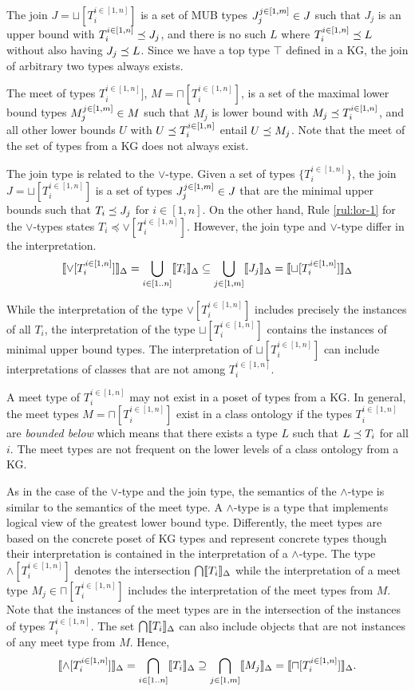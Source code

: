 \documentclass[runningheads]{llncs}
\newcommand{\llb}{\llbracket}
\newcommand{\rrb}{\rrbracket}
\begin{document}
The join $J=\sqcup[T_i^{i\in[1,n]}]$ is a set of MUB types
$J_j^{j\in[1,m]}\in\/J$ such that $J_j$ is an upper bound with
$T_i^{i\in[1,n]}\preceq\/J_j$, and there is no such $L$ where
$T_i^{i\in[1,n]}\preceq\/L$ without also having $J_j\preceq\/L$. Since
we have a top type $\top$ defined in a KG, the join of arbitrary two
types always exists.

The meet of types $T_i^{i\in[1,n]}]$, $M=\sqcap[T_i^{i\in[1,n]}]$, is
a set of the maximal lower bound types $M_j^{j\in[1,m]}\in\/M$ such
that $M_j$ is lower bound with $M_j\preceq\/T_i^{i\in[1,n]}$, and all
other lower bounds $U$ with $U\preceq\/T_i^{i\in[1,n]}$ entail
$U\preceq\/M_j$. Note that the meet of the set of types from a KG does
not always exist.

The join type is related to the $\lor$-type. Given a set of types
$\{T_i^{i\in[1,n]}\}$, the join $J=\sqcup[T_i^{i\in[1,n]}]$ is a set
of types $J_j^{j\in[1,m]}\in\/J$ that are the minimal upper bounds
such that $T_i\preceq\/J_j$ for $i\in[1,n]$. On the other hand,
Rule \ref{rul:lor-1} for the $\lor$-types states
$T_i\preceq\lor[T_i^{i\in[1,n]}]$. However, the join type and
$\lor$-type differ in the interpretation.
$$\llb\lor[T_i^{i\in[1,n]}]\rrb_\D=\bigcup_{i\in[1..n]}\llb\/T_i\rrb_\D\subseteq\bigcup_{j\in[1,m]}\llb\/J_j\rrb_\D=\llb\sqcup[T_i^{i\in[1,n]}]\rrb_\D$$

While the interpretation of the type $\lor[T_i^{i\in[1,n]}]$ includes
precisely the instances of all $T_i$, the interpretation of the type
$\sqcup[T_i^{i\in[1,n]}]$ contains the instances of minimal upper bound
types. The interpretation of $\sqcup[T_i^{i\in[1,n]}]$ can include
interpretations of classes that are not among $T_i^{i\in[1,n]}$.

A meet type of $T_i^{i\in[1,n]}$ may not exist in a poset of types
from a KG. In general, the meet types $M=\sqcap[T_i^{i\in[1,n]}]$
exist in a class ontology if the types $T_i^{i\in[1,n]}$ are
\emph{bounded below} \cite{Pierce2002} which means that there exists a
type $L$ such that $L\preceq\/T_i$ for all $i$. The meet types are not
frequent on the lower levels of a class ontology from a KG.

As in the case of the $\lor$-type and the join type, the semantics of
the $\land$-type is similar to the semantics of the meet type. A
$\land$-type is a type that implements logical view of the greatest
lower bound type. Differently, the meet types are based on the
concrete poset of KG types and represent concrete types though their
interpretation is contained in the interpretation of a
$\land$-type. The type $\land[T_i^{i\in[1,n]}]$ denotes the
intersection $\bigcap\/\llb\/T_i\rrb_\D$ while the interpretation of a
meet type $M_j\in\sqcap[T_i^{i\in[1,n]}]$ includes the interpretation
of the meet types from $M$. Note that the instances of the meet types
are in the intersection of the instances of types
$T_i^{i\in[1,n]}$. The set $\bigcap\/\llb\/T_i\rrb_\D$ can also
include objects that are not instances of any meet type from
$M$. Hence,
$$\llb\land[T_i^{i\in[1,n]}]\rrb_\D=\bigcap_{i\in[1..n]}\/\llb\/T_i\rrb_\D\supseteq\bigcap_{j\in[1,m]}\llb\/M_j\rrb_\D=\llb\sqcap[T_i^{i\in[1,n]}]\rrb_\D.$$
\end{document}
